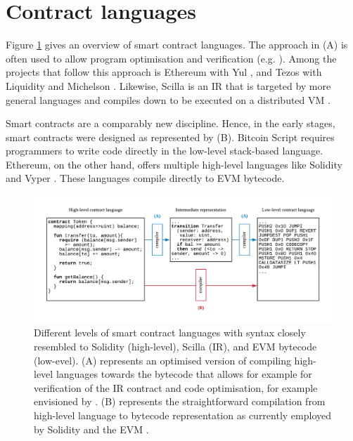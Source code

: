 \section{Contract languages}
\label{languages}

Figure \ref{fig:languagediagram} gives an overview of smart contract languages.
The approach in (A) is often used to allow program optimisation and verification (e.g. \cite{Lattner2004}). 
Among the projects that follow this approach is Ethereum with Yul \cite{EthereumFoundation2018IULIA}, and Tezos with Liquidity \cite{OCamlProSAS2018} and Michelson \cite{DynamicLedgerSolutions2017}.
Likewise, Scilla is an IR that is targeted by more general languages and compiles down to be executed on a distributed VM \cite{Sergey2018}.

Smart contracts are a comparably new discipline.
Hence, in the early stages, smart contracts were designed as represented by (B).
Bitcoin Script \cite{BitcoinWiki2018Script} requires programmers to write code directly in the low-level stack-based language.
Ethereum, on the other hand, offers multiple high-level languages like Solidity \cite{Ethereum2018Solidity} and Vyper \cite{Ethereum2018Vyper}.
These languages compile directly to EVM bytecode. 

\begin{figure}
\includegraphics[width=\textwidth]{fig/Language.pdf}
\caption{Different levels of smart contract languages with syntax closely resembled to Solidity (high-level), Scilla (IR), and EVM bytecode (low-evel). (A) represents an optimised version of compiling high-level languages towards the bytecode that allows for example for verification of the IR contract and code optimisation, for example envisioned by \cite{Sergey2018,OCamlProSAS2018}. (B) represents the straightforward compilation from high-level language to bytecode representation as currently employed by Solidity and the EVM \cite{Ethereum2018Solidity,Wood2014}.}
\label{fig:languagediagram}
\end{figure}


